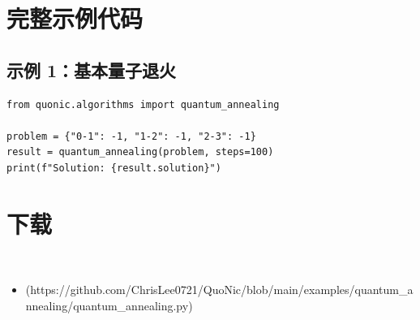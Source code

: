 \documentclass[12pt,a4paper]{article}
\begin{document}
\section{完整示例代码}

\subsection{示例 1：基本量子退火}

\begin{lstlisting}[style=python]
from quonic.algorithms import quantum_annealing

problem = {"0-1": -1, "1-2": -1, "2-3": -1}
result = quantum_annealing(problem, steps=100)
print(f"Solution: {result.solution}")
\end{lstlisting}


\section{下载}

\begin{itemize}
  \item [quantum_annealing.py](https://github.com/ChrisLee0721/QuoNic/blob/main/examples/quantum_annealing/quantum_annealing.py)
\end{itemize}
\end{document}
